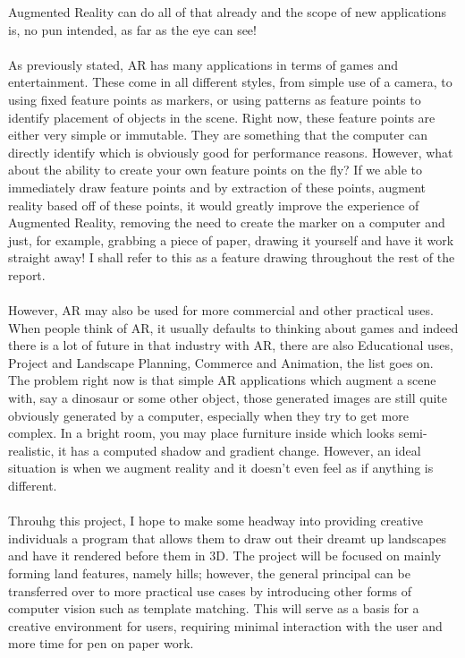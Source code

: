\documentclass[11pt]{article}
\begin{document}
Augmented Reality can do all of that already and the scope of new
applications is, no pun intended, as far as the eye can see!    
\\ \\
As previously stated, AR has many applications in terms of games and 
entertainment. These come in all different styles, from simple use of a camera,
to using fixed feature points as markers, or using patterns as feature points
to identify placement of objects in the scene. Right now, these feature points
are either very simple or immutable. They are something that the computer
can directly identify which is obviously good for performance reasons. However,
what about the ability to create your own feature points on the fly? If we
able to immediately draw feature points and by extraction of these points, 
augment reality based off of these points, it would greatly improve the 
experience of Augmented Reality, removing the need to create the marker 
on a computer and just, for example, grabbing a piece of paper, drawing it
yourself and have it work straight away! I shall refer to this as a feature
drawing throughout the rest of the report. 
\\ \\
However, AR may also be used for more commercial and other practical uses. 
When people think of AR, it usually defaults to thinking about games and 
indeed there is a lot of future in that industry with AR, there are also
Educational uses, Project and Landscape Planning, Commerce and Animation, 
the list goes on. The problem right now is that simple AR applications which
augment a scene with, say a dinosaur or some other object, those generated
images are still quite obviously generated by a computer, especially when 
they try to get more complex. In a bright room, you may place furniture inside
which looks semi-realistic, it has a computed shadow and gradient change. 
However, an ideal situation is when we augment reality and it doesn't even
feel as if anything is different.
\\ \\
Throuhg this project, I hope to make some headway into providing creative
individuals a program that allows them to draw out their dreamt up
landscapes and have it rendered before them in 3D. The project will be focused
on mainly forming land features, namely hills; however, the general principal can be 
transferred over to more practical use cases by introducing other forms of
computer vision such as template matching. This will serve as a basis for a 
creative environment for users, requiring minimal interaction with the user and
more time for pen on paper work. 
\\ \\
\end{document}
